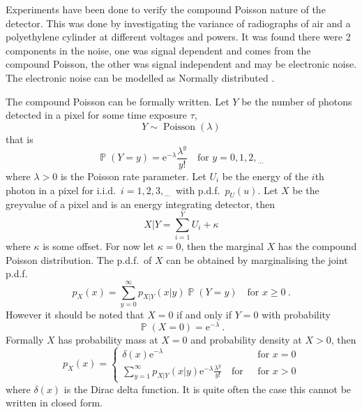 \documentclass[12pt, a4paper]{memoir}
\DeclareMathOperator{\prob}{\mathbb{P}}
\DeclareMathOperator{\poisson}{Poisson}
\newcommand{\euler}{\mathrm{e}}
\newcommand{\dotdotdot}{_{\phantom{.}\cdots}}
\begin{document}
Experiments have been done to verify the compound Poisson nature of the detector. This was done by investigating the variance of radiographs of air \citep{hsieh2015compound} and a polyethylene cylinder \citep{yang2009evaluation} \citep{yang2010noise} at different voltages and powers. It was found there were 2 components in the noise, one was signal dependent and comes from the compound Poisson, the other was signal independent and may be electronic noise. The electronic noise can be modelled as Normally distributed \citep{xu2009electronic}.

The compound Poisson can be formally written. Let $Y$ be the number of photons detected in a pixel for some time exposure $\tau$,
\begin{equation*}
	Y\sim\poisson(\lambda)
\end{equation*}
that is
\begin{equation*}
	\prob(Y=y)=\euler^{-\lambda}\frac{\lambda^y}{y!} \quad \text{for }y=0,1,2,\dotdotdot
\end{equation*}
where $\lambda>0$ is the Poisson rate parameter. Let $U_i$ be the energy of the $i$th photon in a pixel for i.i.d.~$i=1,2,3,\dotdotdot$ with p.d.f.~$p_U(u)$. Let $X$ be the greyvalue of a pixel and is an energy integrating detector, then
\begin{equation}
	X|Y = \sum_{i=1}^{Y}U_i+\kappa
	\label{eq:compoundPoisson_X|Y}
\end{equation}
where $\kappa$ is some offset. For now let $\kappa=0$, then the marginal $X$ has the compound Poisson distribution. The p.d.f.~of $X$ can be obtained by marginalising the joint p.d.f.
\begin{equation*}
	p_X(x)=\sum_{y=0}^\infty p_{X|Y}(x|y)\prob(Y=y) \quad\text{for }x\geqslant 0
	\ .
\end{equation*}
However it should be noted that $X=0$ if and only if $Y=0$ with probability
\begin{equation*}
	\prob(X=0)=\euler^{-\lambda} \ .
\end{equation*}
Formally $X$ has probability mass at $X=0$ and probability density at $X>0$, then 
\begin{equation}
	p_X(x) = 
	\begin{cases}
		\delta(x) \euler^{-\lambda}  & \text{ for } x=0 \\ 
		\sum_{y=1}^\infty p_{X|Y}(x|y)\euler^{-\lambda}\frac{\lambda^y}{y!} \quad\text{for } & \text{ for } x>0
	\end{cases}
\end{equation}
where $\delta(x)$ is the Dirac delta function. It is quite often the case this cannot be written in closed form.
\end{document}
